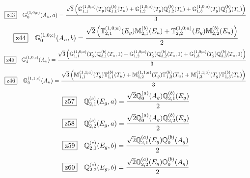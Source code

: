 \documentclass[fleqn,10pt,landscape]{jsarticle}
\begin{document}
\begin{dmath*}
\hspace*{3mm}\fbox{z43}\quad \mathbb{G}_{0}^{(1,0;c)}(A_{u},a)=\frac{\sqrt{3} \left(\mathbb{G}_{1,1}^{(1,0;a)}(T_{g}) \mathbb{Q}_{1,1}^{(b)}(T_{u}) + \mathbb{G}_{1,2}^{(1,0;a)}(T_{g}) \mathbb{Q}_{1,2}^{(b)}(T_{u}) + \mathbb{G}_{1,3}^{(1,0;a)}(T_{g}) \mathbb{Q}_{1,3}^{(b)}(T_{u})\right)}{3}
\end{dmath*}
\begin{dmath*}
\hspace*{3mm}\fbox{z44}\quad \mathbb{G}_{0}^{(1,0;c)}(A_{u},b)=\frac{\sqrt{2} \left(\mathbb{T}_{2,1}^{(1,0;a)}(E_{g}) \mathbb{M}_{2,1}^{(b)}(E_{u}) + \mathbb{T}_{2,2}^{(1,0;a)}(E_{g}) \mathbb{M}_{2,2}^{(b)}(E_{u})\right)}{2}
\end{dmath*}
\begin{dmath*}
\hspace*{3mm}\fbox{z45}\quad \mathbb{G}_{4}^{(1,0;c)}(A_{u})=\frac{\sqrt{3} \left(\mathbb{G}_{1,1}^{(1,0;a)}(T_{g}) \mathbb{Q}_{3,1}^{(b)}(T_{u},1) + \mathbb{G}_{1,2}^{(1,0;a)}(T_{g}) \mathbb{Q}_{3,2}^{(b)}(T_{u},1) + \mathbb{G}_{1,3}^{(1,0;a)}(T_{g}) \mathbb{Q}_{3,3}^{(b)}(T_{u},1)\right)}{3}
\end{dmath*}
\begin{dmath*}
\hspace*{3mm}\fbox{z46}\quad \mathbb{G}_{0}^{(1,1;c)}(A_{u})=\frac{\sqrt{3} \left(\mathbb{M}_{1,1}^{(1,1;a)}(T_{g}) \mathbb{T}_{1,1}^{(b)}(T_{u}) + \mathbb{M}_{1,2}^{(1,1;a)}(T_{g}) \mathbb{T}_{1,2}^{(b)}(T_{u}) + \mathbb{M}_{1,3}^{(1,1;a)}(T_{g}) \mathbb{T}_{1,3}^{(b)}(T_{u})\right)}{3}
\end{dmath*}
\begin{dmath*}
\hspace*{3mm}\fbox{z57}\quad \mathbb{Q}_{2,1}^{(c)}(E_{g},a)=\frac{\sqrt{2} \mathbb{Q}_{0}^{(a)}(A_{g}) \mathbb{Q}_{2,1}^{(b)}(E_{g})}{2}
\end{dmath*}
\begin{dmath*}
\hspace*{3mm}\fbox{z58}\quad \mathbb{Q}_{2,2}^{(c)}(E_{g},a)=\frac{\sqrt{2} \mathbb{Q}_{0}^{(a)}(A_{g}) \mathbb{Q}_{2,2}^{(b)}(E_{g})}{2}
\end{dmath*}
\begin{dmath*}
\hspace*{3mm}\fbox{z59}\quad \mathbb{Q}_{2,1}^{(c)}(E_{g},b)=\frac{\sqrt{2} \mathbb{Q}_{2,1}^{(a)}(E_{g}) \mathbb{Q}_{0}^{(b)}(A_{g})}{2}
\end{dmath*}
\begin{dmath*}
\hspace*{3mm}\fbox{z60}\quad \mathbb{Q}_{2,2}^{(c)}(E_{g},b)=\frac{\sqrt{2} \mathbb{Q}_{2,2}^{(a)}(E_{g}) \mathbb{Q}_{0}^{(b)}(A_{g})}{2}
\end{dmath*}
\end{document}
